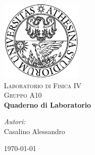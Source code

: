 \begin{titlepage}
\begin{center}

\includegraphics[width=0.3\textwidth]{unitn_logo.jpg}~\\[1cm]

\textsc{\LARGE Laboratorio di Fisica IV}\\[1.5cm]
\textsc{\Large Gruppo A10}\\[0.5cm]

{ \huge \bfseries Quaderno di Laboratorio}\\[0.4cm]

\begin{minipage}{0.4\textwidth}
\begin{flushleft} \large
\emph{Autori:}\\
Casalino Alessandro
\end{flushleft}
\end{minipage}

\vfill

{\large \today}

\end{center}
\end{titlepage}
